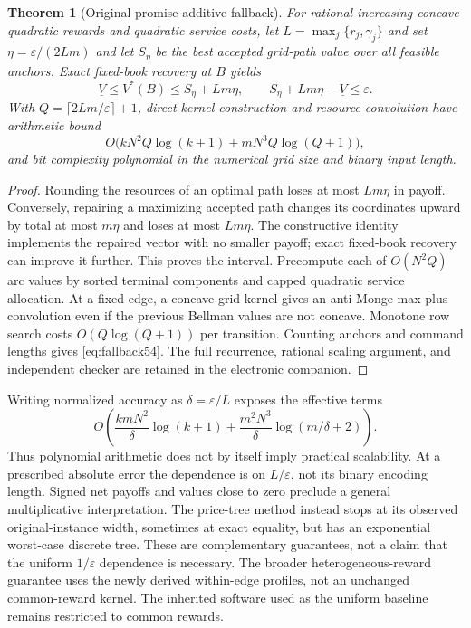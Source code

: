 \documentclass[11pt,letterpaper]{article}
\newtheorem{theorem}{Theorem}[section]
\theoremstyle{definition}\newtheorem{remark}[theorem]{Remark}
\begin{document}
\begin{theorem}[Original-promise additive fallback]\label{thm:uniform54}
For rational increasing concave quadratic rewards and quadratic service costs, let $L=\max_j\{r_j,\gamma_j\}$ and set $\eta=\varepsilon/(2Lm)$ and let $S_\eta$ be the best accepted grid-path value over all feasible anchors. Exact fixed-book recovery at $B$ yields
\[
 \underline V\leq V^*(B)\leq S_\eta+Lm\eta,
 \qquad S_\eta+Lm\eta-\underline V\leq\varepsilon.
\]
With $Q=\lceil2Lm/\varepsilon\rceil+1$, direct kernel construction and resource convolution have arithmetic bound
\begin{equation}\label{eq:fallback54}
 O\bigl(kN^2Q\log(k+1)+mN^3Q\log(Q+1)\bigr),
\end{equation}
and bit complexity polynomial in the numerical grid size and binary input length.
\end{theorem}
\begin{proof}
Rounding the resources of an optimal path loses at most $Lm\eta$ in payoff. Conversely, repairing a maximizing accepted path changes its coordinates upward by total at most $m\eta$ and loses at most $Lm\eta$. The constructive identity implements the repaired vector with no smaller payoff; exact fixed-book recovery can improve it further. This proves the interval. Precompute each of $O(N^2Q)$ arc values by sorted terminal components and capped quadratic service allocation. At a fixed edge, a concave grid kernel gives an anti-Monge max-plus convolution even if the previous Bellman values are not concave. Monotone row search costs $O(Q\log(Q+1))$ per transition. Counting anchors and command lengths gives \eqref{eq:fallback54}. The full recurrence, rational scaling argument, and independent checker are retained in the electronic companion.
\end{proof}
Writing normalized accuracy as $\delta=\varepsilon/L$ exposes the effective terms
\[
 O\left(\frac{kmN^2}{\delta}\log(k+1)
       +\frac{m^2N^3}{\delta}\log(m/\delta+2)\right).
\]
Thus polynomial arithmetic does not by itself imply practical scalability. At a prescribed absolute error the dependence is on $L/\varepsilon$, not its binary encoding length. Signed net payoffs and values close to zero preclude a general multiplicative interpretation. The price-tree method instead stops at its observed original-instance width, sometimes at exact equality, but has an exponential worst-case discrete tree. These are complementary guarantees, not a claim that the uniform $1/\varepsilon$ dependence is necessary. The broader heterogeneous-reward guarantee uses the newly derived within-edge profiles, not an unchanged common-reward kernel. The inherited software used as the uniform baseline remains restricted to common rewards.
\end{document}
